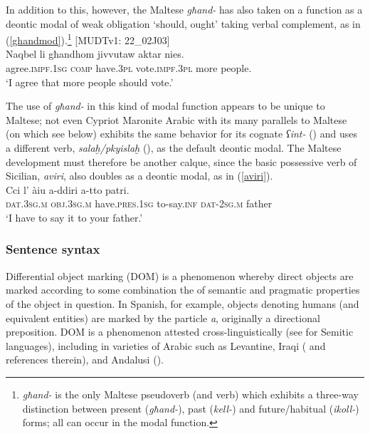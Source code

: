 \documentclass[output=paper]{langsci/langscibook}
\begin{document}
In addition to this, however, the Maltese \textit{għand-} has also taken on a function as a deontic modal of weak obligation `should, ought' taking verbal complement, as in (\ref{ghandmod}).\footnote{\textit{għand-} is the only Maltese pseudoverb (and verb) which exhibits a three-way distinction between present (\textit{għand-}), past (\textit{kell-}) and future/habitual (\textit{ikoll-}) forms; all can occur in the modal function.}
\ea\label{ghandmod}   
{[MUDTv1: 22\_02J03]} \\
    \gll Naqbel	li għandhom jivvutaw aktar nies.\\
	agree.\textsc{impf.1sg} \textsc{comp} have.\textsc{3pl} vote.\textsc{impf.3pl} more people.\\
	\glt `I agree that more people should vote.'\\
\z

The use of \textit{għand-} in this kind of modal function appears to be unique to Maltese; not even Cypriot Maronite Arabic with its many parallels to Maltese (on which see below) exhibits the same behavior for its cognate \textit{ʕint-} (\citealt[346]{Borg2004}) and uses a different verb, \textit{salaḫ/pkyislaḫ} (\citealt[323]{Borg2004}), as the default deontic modal. The Maltese development must therefore be another calque, since the basic possessive verb of Sicilian, \textit{aviri}, also doubles as a deontic modal, as in (\ref{aviri}).
\ea\label{aviri} 
    \\
    \gll Cci l' àiu a-ddiri a-tto patri.\\
	\textsc{dat.3sg.m} \textsc{obj.3sg.m} have.\textsc{pres.1sg} to-say.\textsc{inf} \textsc{dat-2sg.m} father\\
	\glt `I have to say it to your father.'\\
\z

\subsubsection{Sentence syntax}
Differential object marking (DOM) is a phenomenon whereby direct objects are marked according to some combination the of semantic and pragmatic properties of the object in question. In Spanish, for example, objects denoting humans (and equivalent entities) are marked by the particle \textit{a}, originally a directional preposition. DOM is a phenomenon attested cross-linguistically (see \citealt{Khan1984} for Semitic languages), including in varieties of Arabic such as Levantine, Iraqi (\citealt{Coghill2014} and references therein), and Andalusi (\citealt[108]{Andalusi2013}).
\end{document}
